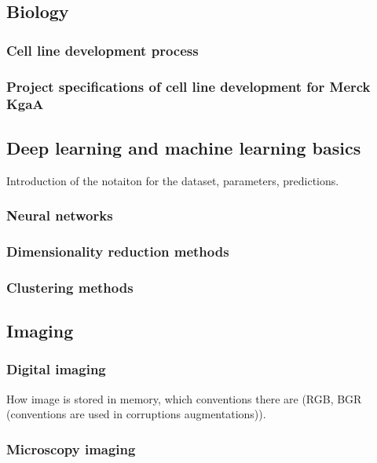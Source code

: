     \subsection{Biology}
        \subsubsection{Cell line development process}
        
        \subsubsection{Project specifications of cell line development for Merck KgaA}
        
    \subsection{Deep learning and machine learning basics}
        Introduction of the notaiton for the dataset, parameters, predictions.
        \subsubsection{Neural networks}
            
        \subsubsection{Dimensionality reduction methods}
            
        \subsubsection{Clustering methods}
            
    \subsection{Imaging}
        \subsubsection{Digital imaging}
            
            How image is stored in memory, which conventions there are (RGB, BGR (conventions are used in corruptions augmentations)).
        \subsubsection{Microscopy imaging}
            